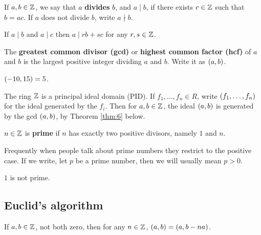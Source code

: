\begin{definition}
If $ a, b \in \mathbb{Z} $, we say that $ a $ \textbf{divides} $ b $, and $ a \mid b $, if there exists $ c \in \mathbb{Z} $ such that $ b = ac $. If $ a $ does not divide $ b $, write $ a \nmid b $.
\end{definition}

If $ a \mid b $ and $ a \mid c $ then $ a \mid rb + sc $ for any $ r, s \in \mathbb{Z} $.

\begin{definition}
The \textbf{greatest common divisor (gcd)} or \textbf{highest common factor (hcf)} of $ a $ and $ b $ is the largest positive integer dividing $ a $ and $ b $. Write it as $ \br{a, b} $.
\end{definition}

\begin{example*}
$ \br{-10, 15} = 5 $.
\end{example*}

\begin{note*}
The ring $ \mathbb{Z} $ is a principal ideal domain (PID). If $ f_1, \dots, f_n \in R $, write $ \br{f_1, \dots, f_n} $ for the ideal generated by the $ f_i $. Then for $ a, b \in \mathbb{Z} $, the ideal $ \br{a, b} $ is generated by the gcd $ \br{a, b} $, by Theorem \ref{thm:6} below.
\end{note*}

\begin{definition}
$ n \in \mathbb{Z} $ is \textbf{prime} if $ n $ has exactly two positive divisors, namely $ 1 $ and $ n $.
\end{definition}

\begin{note*}
Frequently when people talk about prime numbers they restrict to the positive case. If we write, let $ p $ be a prime number, then we will usually mean $ p > 0 $.
\end{note*}

\begin{note*}
$ 1 $ is not prime.
\end{note*}

\subsection{Euclid's algorithm}

\begin{proposition}
If $ a, b \in \mathbb{Z} $, not both zero, then for any $ n \in \mathbb{Z} $, $ \br{a, b} = \br{a, b - na} $.
\end{proposition}

